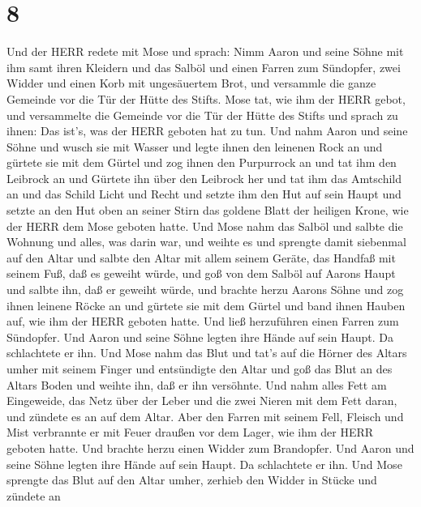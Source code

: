 \hypertarget{section-7}{%
\section{8}\label{section-7}}

 Und der HERR redete mit Mose und sprach:  Nimm
Aaron und seine Söhne mit ihm samt ihren Kleidern und das Salböl und
einen Farren zum Sündopfer, zwei Widder und einen Korb mit ungesäuertem
Brot,  und versammle die ganze Gemeinde vor die Tür der
Hütte des Stifts.  Mose tat, wie ihm der HERR gebot, und
versammelte die Gemeinde vor die Tür der Hütte des Stifts 
und sprach zu ihnen: Das ist's, was der HERR geboten hat zu tun.
 Und nahm Aaron und seine Söhne und wusch sie mit Wasser
 und legte ihnen den leinenen Rock an und gürtete sie mit
dem Gürtel und zog ihnen den Purpurrock an und tat ihm den Leibrock an
und Gürtete ihn über den Leibrock her  und tat ihm das
Amtschild an und das Schild Licht und Recht  und setzte ihm
den Hut auf sein Haupt und setzte an den Hut oben an seiner Stirn das
goldene Blatt der heiligen Krone, wie der HERR dem Mose geboten hatte.
 Und Mose nahm das Salböl und salbte die Wohnung und alles,
was darin war, und weihte es  und sprengte damit siebenmal
auf den Altar und salbte den Altar mit allem seinem Geräte, das Handfaß
mit seinem Fuß, daß es geweiht würde,  und goß von dem
Salböl auf Aarons Haupt und salbte ihn, daß er geweiht würde,
 und brachte herzu Aarons Söhne und zog ihnen leinene Röcke
an und gürtete sie mit dem Gürtel und band ihnen Hauben auf, wie ihm der
HERR geboten hatte.  Und ließ herzuführen einen Farren zum
Sündopfer. Und Aaron und seine Söhne legten ihre Hände auf sein Haupt.
 Da schlachtete er ihn. Und Mose nahm das Blut und tat's
auf die Hörner des Altars umher mit seinem Finger und entsündigte den
Altar und goß das Blut an des Altars Boden und weihte ihn, daß er ihn
versöhnte.  Und nahm alles Fett am Eingeweide, das Netz
über der Leber und die zwei Nieren mit dem Fett daran, und zündete es an
auf dem Altar.  Aber den Farren mit seinem Fell, Fleisch
und Mist verbrannte er mit Feuer draußen vor dem Lager, wie ihm der HERR
geboten hatte.  Und brachte herzu einen Widder zum
Brandopfer. Und Aaron und seine Söhne legten ihre Hände auf sein Haupt.
 Da schlachtete er ihn. Und Mose sprengte das Blut auf den
Altar umher,  zerhieb den Widder in Stücke und zündete an
